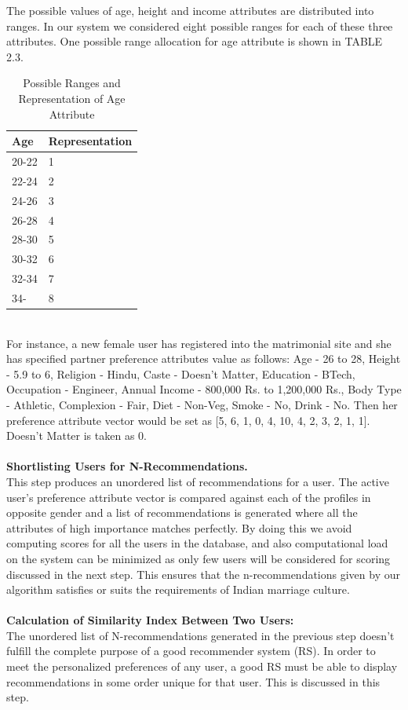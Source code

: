 \documentclass[12pt,oneside]{book}
\begin{document}
\newpage
The possible values of age, height and income attributes are distributed into ranges. In our system we considered eight possible ranges for each of these three attributes. One possible range allocation for age attribute is shown in TABLE 2.3.
\begin{table}[h!]
\centering
\caption{Possible Ranges and Representation of Age Attribute}
\vspace{0.1in}
 \begin{tabular}{|m{4cm}|m{8em}|}
 \hline
 Age & Representation\\
\hline
20-22 & 1 \\
\hline
22-24& 2  \\
\hline
24-26&3 \\
\hline
26-28 &4 \\
\hline
28-30 & 5 \\
\hline
30-32& 6\\
\hline
32-34& 7 \\
\hline
34- & 8 \\
\hline
\end{tabular}
\end{table}\\
For instance, a new female user has registered into the matrimonial site and she has specified partner preference attributes value as follows:
Age - 26 to 28, Height - 5.9 to 6, Religion - Hindu, Caste - Doesn't Matter, Education - BTech, Occupation - Engineer, Annual Income - 800,000 Rs. to 1,200,000 Rs., Body Type - Athletic, Complexion - Fair, Diet - Non-Veg, Smoke - No, Drink - No.
Then her preference attribute vector would be set as [5, 6, 1, 0, 4, 10, 4, 2, 3, 2, 1, 1]. Doesn't Matter is taken as 0.\\\\
\textbf{Shortlisting Users for N-Recommendations.}\\
This step produces an unordered list of recommendations for a user. The active user's preference attribute vector is compared against each of the profiles in opposite gender and a list of recommendations is generated where all the attributes of high importance matches perfectly. By doing this we avoid computing scores for all the users in the database, and also computational load on the system can be minimized as only few users will be considered for scoring discussed in the next step. This ensures that the n-recommendations given by our algorithm satisfies or suits the requirements of Indian marriage culture.\\\\
\textbf{Calculation of Similarity Index Between Two Users:}\\
The unordered list of N-recommendations generated in the previous step doesn't fulfill the complete purpose of a good recommender system (RS). In order to meet the personalized preferences of any user, a good RS must be able to display recommendations in some order unique for that user. This is discussed in this step.
\end{document}
